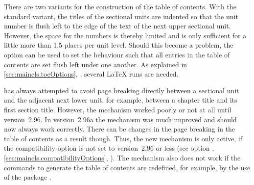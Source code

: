 There are two variants for the construction of the table of
contents. With the standard variant, the titles of the sectional units
are indented so that the unit number is flush left to the edge of the
text of the next upper sectional unit.  However, the space for the
numbers is thereby limited and is only sufficient for a little more
than 1.5 places per unit level.  Should this become a problem, the
option  can be used to set the behaviour such that all
entries in the table of contents are set flush left under one
another. As explained in \autoref{sec:maincls.tocOptions},
, several {\LaTeX} runs are
needed.

{\KOMAScript} has always attempted to avoid page breaking directly
between a sectional unit and the adjacent next lower unit, for
example, between a chapter title and its first section title. However,
the mechanism worked poorly or not at all until version~2.96. In
version~2.96a the
mechanism was much improved and should now always work
correctly. There can be changes in the page breaking in the table of
contents as a result though. Thus, the new mechanism is only active,
if the compatibility option is not set to version~2.96 or less (see
option , \autoref{sec:maincls.compatibilityOptions},
). The mechanism also does
not work if the commands to generate the table of contents are
redefined, for example, by the use of the package .
